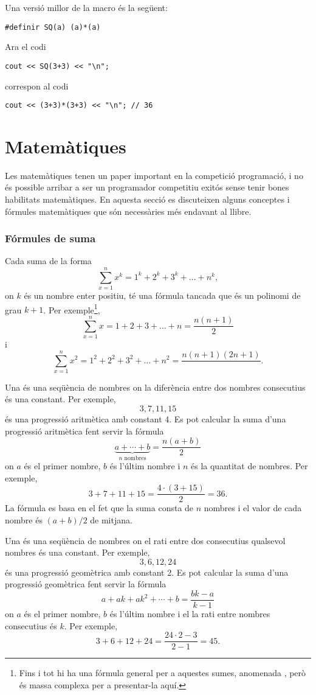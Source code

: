 Una versió millor de la macro és la següent:
\begin{lstlisting}
#definir SQ(a) (a)*(a)
\end{lstlisting}
Ara el codi
\begin{lstlisting}
cout << SQ(3+3) << "\n";
\end{lstlisting}
correspon al codi
\begin{lstlisting}
cout << (3+3)*(3+3) << "\n"; // 36
\end{lstlisting}


\section{Matemàtiques}

Les matemàtiques tenen un paper important en la competició
programació, i no és possible arribar a ser
un programador competitiu exitós sense
tenir bones habilitats matemàtiques.
En aquesta secció es discuteixen alguns conceptes
i fórmules matemàtiques que són necess\`aries
més endavant al llibre.

\subsubsection{Fórmules de suma}

Cada suma de la forma
\[\sum_{x=1}^n x^k = 1^k+2^k+3^k+\ldots+n^k,\]
on $k$ és un nombre enter positiu,
té una fórmula tancada que és un
polinomi de grau $k+1$.
Per exemple\footnote{
Fins i tot hi ha una fórmula general per a aquestes sumes,
anomenada ,
però és massa complexa per a presentar-la aquí.},
\[\sum_{x=1}^n x = 1+2+3+\ldots+n = \frac{n(n+1)}{2}\]
i
\[\sum_{x=1}^nx^2 = 1^2+2^2+3^2+\ldots+n^2 = \frac{n(n+1)(2n+1)}{ }.\]

Una  és una 
seqüència de nombres
on la diferència entre dos nombres consecutius 
és una constant.
Per exemple,
\[3, 7, 11, 15\]
és una progressió aritmètica amb constant 4.
Es pot calcular la suma d'una progressió aritmètica
fent servir la fórmula
\[\underbrace{a + \cdots + b}_{n \,\, \textrm{nombres}} = \frac{n(a+b)}{2}\]
on $a$ és el primer nombre,
$b$ és l'últim nombre i
$n$ és la quantitat de nombres.
Per exemple,
\[3+7+11+15=\frac{4 \cdot (3+15)}{2} = 36.\]
La fórmula es basa en el fet
que la suma consta de $n$ nombres i
el valor de cada nombre és $(a+b)/2$ de mitjana.

Una  és una seqüència
de nombres
on el rati entre dos consecutius qualsevol
nombres és una constant.
Per exemple,
\[3,6,12,24\]
és una progressió geomètrica amb constant 2.
Es pot calcular la suma d'una progressió geomètrica
fent servir la fórmula
\[a + ak + ak^2 + \cdots + b = \frac{bk-a}{k-1}\]
on $a$ és el primer nombre,
$b$ és l'últim nombre i el
la rati entre nombres consecutius és $k$.
Per exemple,
\[3+6+12+24=\frac{24 \cdot 2 - 3}{2-1} = 45.\]

